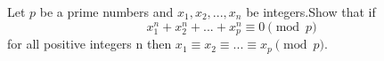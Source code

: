 Let $p$ be a prime numbers and $x_1,x_2,...,x_n$ be integers.Show that if\[x_1^n+x_2^n+...+x_p^n\equiv 0 \pmod{p}\]for all positive integers n then $x_1\equiv x_2 \equiv...\equiv x_p \pmod{p}.$
